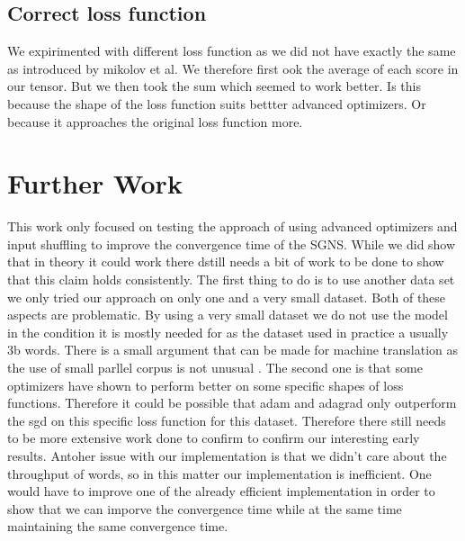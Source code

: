 \subsection{Correct loss function}
We expirimented with different loss function as we did not have exactly the same as introduced by mikolov et al. We therefore first ook the average of each score in our tensor. But we then took the sum which seemed to work  better. Is this because the shape of the loss function suits bettter advanced optimizers. Or because it approaches the original loss function more. 


\section{Further Work}
This work only focused on testing the approach of using advanced optimizers and input shuffling to improve the convergence time of the SGNS. While we did show that in theory it could work there dstill needs a bit of work to be done to show that this claim holds consistently. The first thing to do is to use another data set we only tried our approach on only one and a very small dataset. Both of these aspects are problematic. By using a very small dataset we do not use the model in the condition it is mostly needed for as the dataset used in practice a usually 3b words. There is a small argument that can be made for machine translation as the use of small parllel corpus is not unusual . The second one is that some optimizers have shown to perform better on some specific shapes of loss functions. Therefore it could be possible that adam and adagrad only outperform the sgd on this specific loss function for this dataset. Therefore there still needs to be more extensive work done to confirm to confirm our interesting early results. Antoher issue with our implementation is that we didn't care about the throughput of words, so in this matter our implementation is inefficient. One would have to improve one of the already efficient implementation in order to show that we can imporve the convergence time while at the same time maintaining the same convergence time.



